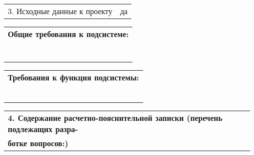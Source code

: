 \documentclass[12pt, А4]{article} %
\begin{document}
\begin{FlushLeft}
    \begin{tabular}{p{6.9cm} p{9.95cm}} %
        \textsf{3. Исходные данные к проекту} &
        \textsf{да} \vspace{1pt} \hline
    \end{tabular} %

    \begin{tabular}{p{17.25cm}} %
        \textsf{\textbf{Общие требования к подсистеме:}} \vspace{1pt} \hline \\
        \vspace{1pt} \hline \\
        \vspace{1pt} \hline \\
        \vspace{1pt} \hline \\
        \vspace{1pt} \hline \\
        \vspace{1pt} \hline \\
        \vspace{1pt} \hline \\
        \vspace{1pt} \hline
    \end{tabular} %

    \begin{tabular}{p{17.25cm}} %
        \textsf{\textbf{Требования к функция подсистемы:}} \vspace{1pt} \hline \\
        \vspace{1pt} \hline \\
        \vspace{1pt} \hline \\
        \vspace{1pt} \hline \\
        \vspace{1pt} \hline \\
        \vspace{1pt} \hline \\
        \vspace{1pt} \hline 
    \end{tabular} %

    \begin{tabular}{p{17.25cm}} %
        \textsf{\textbf{4. Содержание расчетно-пояснительной записки (перечень подлежащих разра-}} \vspace{1pt} \hline \\
        \textsf{\textbf{ботке вопросов:)}} \vspace{1pt} \hline \\
    \end{tabular} %
    

\end{FlushLeft}
\end{document}

